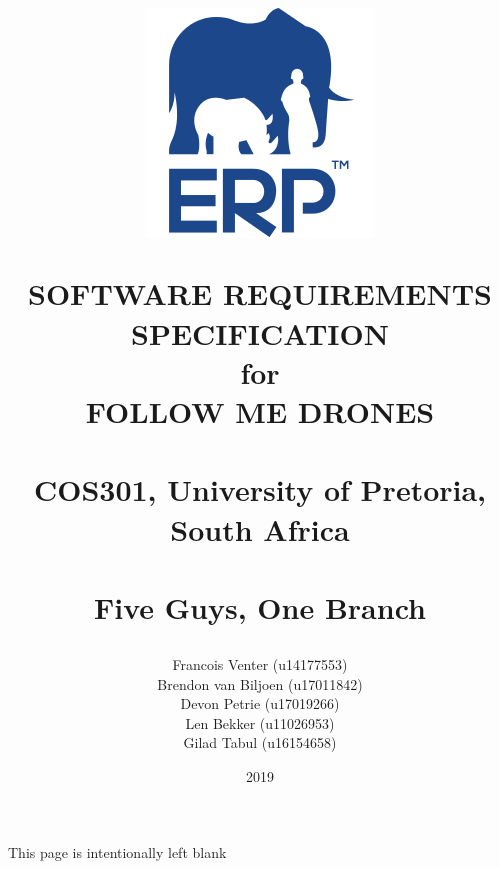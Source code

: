 \documentclass[a4paper,11pt]{book}
\title{
	\begin{figure}[h!]
		\centering
		\includegraphics[scale=0.5]{./assets/images/erp-logo.png}
		\label{fig: erp-logo}
		\caption{}
	\end{figure}
	\vspace{0.5cm}
	\begin{center}
		\Huge{SOFTWARE REQUIREMENTS\\ SPECIFICATION}\\
		for\\
		FOLLOW ME DRONES\\
		~\\
		\LARGE{COS301, University of Pretoria, South Africa}\\
		~\\
		Five Guys, One Branch
	\end{center}
}
\author{
	Francois Venter (u14177553)\\ 
	Brendon van Biljoen (u17011842)\\ 
	Devon Petrie (u17019266)\\ 
	Len Bekker (u11026953)\\ 
	Gilad Tabul (u16154658)\\
}
\date{2019}
\begin{document}
\frontmatter
\maketitle

\begin{center}
	This page is intentionally left blank
\end{center}
\let\cleardoublepage\clearpage
\tableofcontents



\mainmatter

%


% 


% 




\end{document}
